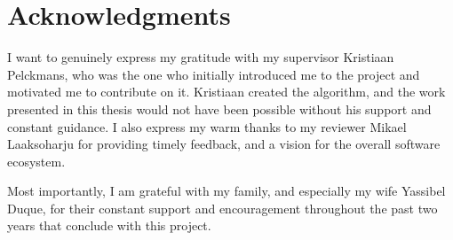 \section*{Acknowledgments} \label{sect:acknowledgments}

I want to genuinely express my gratitude with my supervisor Kristiaan Pelckmans, who was the one who initially introduced me to the \vasco project and motivated me to contribute on it. Kristiaan created the \mlblink algorithm, and the work presented in this thesis would not have been possible without his support and constant guidance. I also express my warm thanks to my reviewer Mikael Laaksoharju for providing timely feedback, and a vision for the overall \mlblink software ecosystem. \newline

Most importantly, I am grateful with my family, and especially my wife Yassibel Duque, for their constant support and encouragement throughout the past two years that conclude with this project.